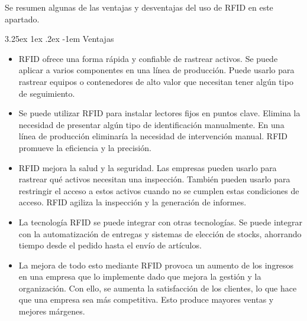 \documentclass[12pt,a4paper,onecolumn,oneside]{report}
\makeatletter
\newcounter{subsubsubsection}[subsubsection]
\renewcommand\paragraph{\@startsection{paragraph}{5}{\z@}%
  {3.25ex \@plus1ex \@minus.2ex}%
  {-1em}%
  {\normalfont\normalsize\bfseries}}
\makeatother
\begin{document}
\label{Ventajas y desventajas}

Se resumen algunas de las ventajas y desventajas del uso de RFID en este apartado.

\paragraph{Ventajas}
\begin{itemize}
\item RFID ofrece una forma rápida y confiable de rastrear activos. Se puede aplicar a varios componentes en una línea de producción. Puede usarlo para rastrear equipos o contenedores de alto valor que necesitan tener algún tipo de seguimiento.
\item Se puede utilizar RFID para instalar lectores fijos en puntos clave. Elimina la necesidad de presentar algún tipo de identificación manualmente. En una línea de producción eliminaría la necesidad de intervención manual. RFID promueve la eficiencia y la precisión.
\item RFID mejora la salud y la seguridad. Las empresas pueden usarlo para rastrear qué activos necesitan una inspección. También pueden usarlo para restringir el acceso a estos activos cuando no se cumplen estas condiciones de acceso. RFID agiliza la inspección y la generación de informes.
\item La tecnología RFID se puede integrar con otras tecnologías. Se puede integrar con la automatización de entregas y sistemas de elección de stocks, ahorrando tiempo desde el pedido hasta el envío de artículos.
\item La mejora de todo esto mediante RFID provoca un aumento de los ingresos en una empresa que lo implemente dado que mejora la gestión y la organización. Con ello, se aumenta la satisfacción de los clientes, lo que hace que una empresa sea más competitiva. Esto produce mayores ventas y mejores márgenes.
\end{itemize}
\end{document}

